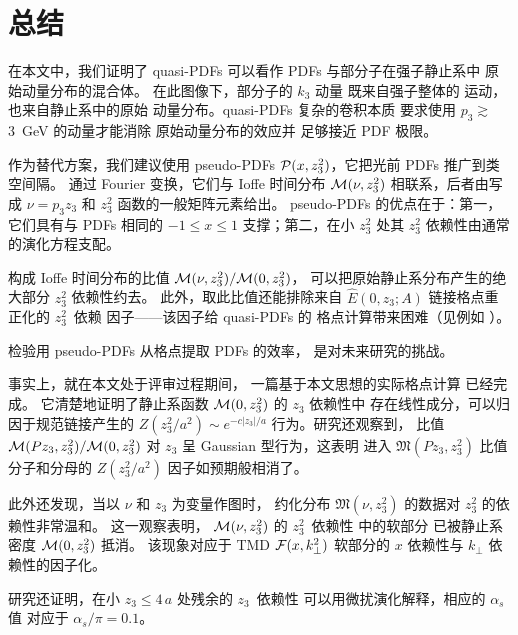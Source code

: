 \section{总结}

在本文中，我们证明了 quasi-PDFs 可以看作 PDFs 与部分子在强子静止系中
原始动量分布的混合体。
在此图像下，部分子的 $k_3$ 动量
既来自强子整体的
运动，也来自静止系中的原始
动量分布。quasi-PDFs 复杂的卷积本质
要求使用 $p_3 \gtrsim $ \mbox{3 GeV} 的动量才能消除
原始动量分布的效应并
足够接近 PDF 极限。

作为替代方案，我们建议使用
pseudo-PDFs ${\cal P} (x, z_3^2)  $，它把光前 PDFs 推广到类空间隔。
通过 Fourier 变换，它们与 Ioffe 时间分布
${\cal M} (\nu, z_3^2) $ 相联系，后者由写成 $\nu = p_3 z_3$ 和 $z_3^2$
函数的一般矩阵元素给出。
pseudo-PDFs 的优点在于：第一，它们具有与 PDFs 相同的
$-1 \leq x \leq 1$ 支撑；第二，在小 $z_3^2$ 处其
$z_3^2$ 依赖性由通常的演化方程支配。

构成 Ioffe 时间分布的比值
${\cal M} (\nu, z_3^2)/{\cal M} (0, z_3^2)$，
可以把原始静止系分布产生的绝大部分 $z_3^2$ 依赖性约去。
此外，取此比值还能排除来自 $\hat E (0,z_3;A)$ 链接格点重正化的
\mbox{$z_3^2$ 依赖} 因子——该因子给 quasi-PDFs 的
格点计算带来困难（见例如 \cite{Ishikawa:2016znu}）。

检验用 pseudo-PDFs 从格点提取 PDFs 的效率，
是对未来研究的挑战。

事实上，就在本文处于评审过程期间，
一篇基于本文思想的实际格点计算 \cite{Orginos:2017kos} 已经完成。
它清楚地证明了静止系函数 ${\cal M} (0,z_3^2)$ 的 $z_3$ 依赖性中
存在线性成分，可以归因于规范链接产生的
$Z(z_3^2/a^2) \sim e^{-c|z_3|/a}$ 行为。研究还观察到，
比值 ${\cal M} (Pz_3 , z_3^2)/{\cal M} (0, z_3^2)$
对 $z_3$ 呈 Gaussian 型行为，这表明
进入 ${\mathfrak M} (Pz_3, z_3^2)$ 比值分子和分母的
$Z(z_3^2/a^2)$ 因子如预期般相消了。

此外还发现，当以 $\nu$ 和 $z_3$ 为变量作图时，
约化分布 ${\mathfrak M} (\nu, z_3^2)$ 的数据对 $z_3^2$ 的依赖性非常温和。
这一观察表明，
${\cal M} (\nu, z_3^2)$ 的 \mbox{$z_3^2$ 依赖性} 中的软部分
已被静止系密度 ${\cal M} (0, z_3^2)$ 抵消。
该现象对应于 TMD ${\cal F} (x, k_\perp^2)$ 软部分的
$x$ 依赖性与 $k_\perp$ 依赖性的因子化。

研究还证明，在小 $z_3 \leq 4 \,a$ 处残余的 \mbox{$z_3$ 依赖性}
可以用微扰演化解释，相应的 $\alpha_s$ 值
对应于 $\alpha_s/\pi =0.1$。

